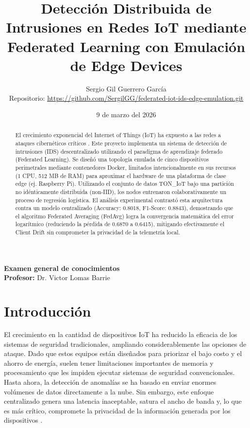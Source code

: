 \documentclass[12pt,a4paper]{article}
\title{\textbf{Detección Distribuida de Intrusiones en Redes IoT mediante Federated Learning con Emulación de Edge Devices}}
\author{Sergio Gil Guerrero García \\ Repositorio: \url{https://github.com/SergilGG/federated-iot-ids-edge-emulation.git}}
\date{9 de marzo del 2026}
\begin{document}
\maketitle

\begin{center}
\textbf{Examen general de conocimientos}\\
\textbf{Profesor:} Dr. Victor Lomas Barrie
\end{center}

\begin{abstract}
El crecimiento exponencial del Internet of Things (IoT) ha expuesto a las redes a ataques cibernéticos críticos \cite{jahangeer2023}. Este proyecto implementa un sistema de detección de intrusiones (IDS) descentralizado utilizando el paradigma de aprendizaje federado (Federated Learning). Se diseñó una topología emulada de cinco dispositivos perimetrales mediante contenedores Docker, limitados intencionalmente en sus recursos (1 CPU, 512 MB de RAM) para aproximar el hardware de una plataforma de clase edge (ej. Raspberry Pi). Utilizando el conjunto de datos TON\_IoT bajo una partición no idénticamente distribuida (non-IID), los nodos entrenaron colaborativamente un proceso de regresión logística. El análisis experimental contrastó esta arquitectura contra un modelo centralizado (Accuracy: 0.8018, F1-Score: 0.8843), demostrando que el algoritmo Federated Averaging (FedAvg) logra la convergencia matemática del error logarítmico (reduciendo la pérdida de 0.6870 a 0.6415), mitigando efectivamente el Client Drift sin comprometer la privacidad de la telemetría local.
\end{abstract}

\section{Introducción}
El crecimiento en la cantidad de dispositivos IoT ha reducido la eficacia de los sistemas de seguridad tradicionales, ampliando considerablemente las opciones de ataque. Dado que estos equipos están diseñados para priorizar el bajo costo y el ahorro de energía, suelen tener limitaciones importantes de memoria y procesamiento que les impiden ejecutar sistemas de seguridad convencionales. Hasta ahora, la detección de anomalías se ha basado en enviar enormes volúmenes de datos directamente a la nube. Sin embargo, este enfoque centralizado genera una latencia inaceptable, satura el ancho de banda y, lo que es más crítico, compromete la privacidad de la información generada por los dispositivos \cite{jahangeer2023}.
\end{document}
